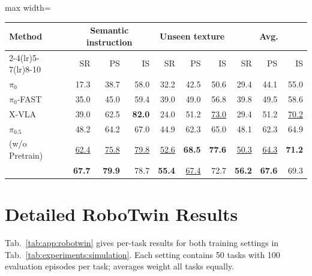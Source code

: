 \begin{center}
\begin{minipage}{\linewidth}
\begin{adjustbox}{max width=\linewidth}
\begin{tabular*}{0.94\linewidth}{@{\extracolsep{\fill}}l*{9}{r}@{}}
        Method & \multicolumn{3}{c}{Semantic instruction}
        & \multicolumn{3}{c}{Unseen texture}
        & \multicolumn{3}{c}{Avg.} \\
        \cmidrule(lr){2-4}\cmidrule(lr){5-7}\cmidrule(lr){8-10}
        & SR & PS & IS & SR & PS & IS & SR & PS & IS \\
        \midrule
        $\pi_0$ & 17.3 & 38.7 & 58.0 & 32.2 & 42.5 & 50.6 & 29.4 & 44.1 & 55.0 \\
        $\pi_0$-FAST & 35.0 & 45.0 & 59.4 & 39.0 & 49.0 & 56.8 & 39.8 & 49.5 & 58.6 \\
        X-VLA & 39.0 & 62.5 & \textbf{82.0} & 24.0 & 51.2 & \underline{73.0} & 29.4 & 51.2 & \underline{70.2} \\
        $\pi_{0.5}$ & 48.2 & 64.2 & 67.0 & 44.9 & 62.3 & 65.0 & 48.1 & 62.3 & 64.9 \\
        \midrule
        \method{} (w/o Pretrain) & \underline{62.4} & \underline{75.8} & \underline{79.8} & \underline{52.6} & \textbf{68.5} & \textbf{77.6} & \underline{50.3} & \underline{64.3} & \textbf{71.2} \\
        \method{} & \textbf{67.7} & \textbf{79.9} & 78.7 & \textbf{55.4} & \underline{67.4} & 72.7 & \textbf{56.2} & \textbf{67.6} & 69.3 \\
        \bottomrule
    \end{tabular*}
    \end{adjustbox}
\end{minipage}
\end{center}

\section{Detailed RoboTwin Results}
\label{app:robotwin}

Tab.~\ref{tab:app:robotwin} gives per-task results for both training settings
in Tab.~\ref{tab:experiments:simulation}. Each setting contains 50 tasks
with 100 evaluation episodes per task; averages weight all tasks equally.

